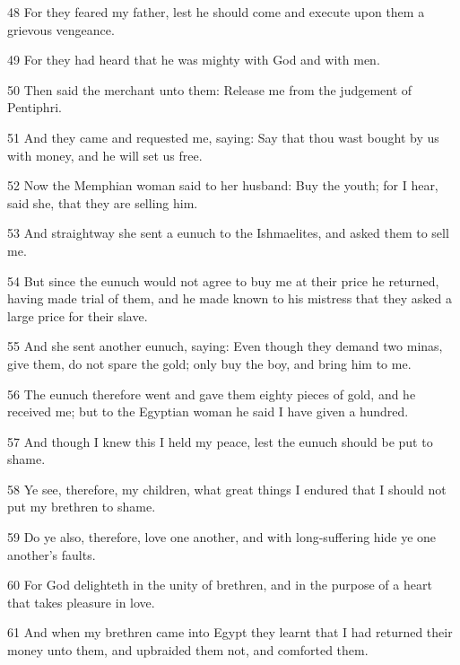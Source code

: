 \par 48 For they feared my father, lest he should come and execute upon them a grievous vengeance.

\par 49 For they had heard that he was mighty with God and with men.

\par 50 Then said the merchant unto them: Release me from the judgement of Pentiphri.

\par 51 And they came and requested me, saying: Say that thou wast bought by us with money, and he will set us free.

\par 52 Now the Memphian woman said to her husband: Buy the youth; for I hear, said she, that they are selling him.

\par 53 And straightway she sent a eunuch to the Ishmaelites, and asked them to sell me.

\par 54 But since the eunuch would not agree to buy me at their price he returned, having made trial of them, and he made known to his mistress that they asked a large price for their slave.

\par 55 And she sent another eunuch, saying: Even though they demand two minas, give them, do not spare the gold; only buy the boy, and bring him to me.

\par 56 The eunuch therefore went and gave them eighty pieces of gold, and he received me; but to the Egyptian woman he said I have given a hundred.

\par 57 And though I knew this I held my peace, lest the eunuch should be put to shame.

\par 58 Ye see, therefore, my children, what great things I endured that I should not put my brethren to shame.

\par 59 Do ye also, therefore, love one another, and with long-suffering hide ye one another's faults.

\par 60 For God delighteth in the unity of brethren, and in the purpose of a heart that takes pleasure in love.

\par 61 And when my brethren came into Egypt they learnt that I had returned their money unto them, and upbraided them not, and comforted them.

